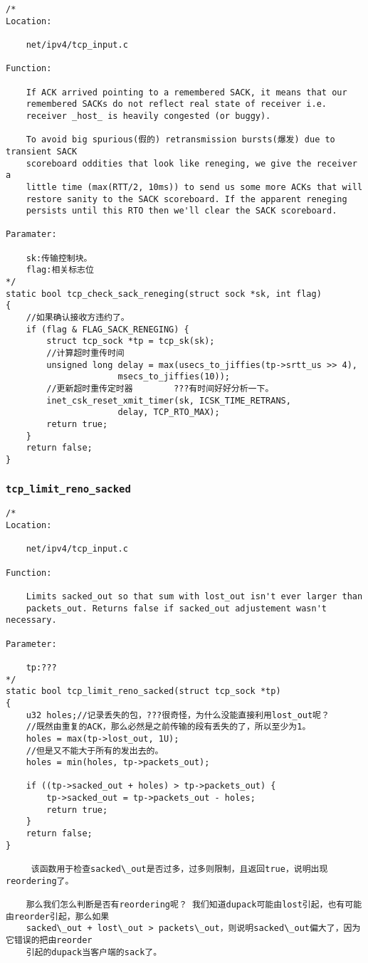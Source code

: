 \begin{verbatim}
/*
Location:

    net/ipv4/tcp_input.c

Function:

    If ACK arrived pointing to a remembered SACK, it means that our
    remembered SACKs do not reflect real state of receiver i.e.
    receiver _host_ is heavily congested (or buggy).

    To avoid big spurious(假的) retransmission bursts(爆发) due to transient SACK
    scoreboard oddities that look like reneging, we give the receiver a
    little time (max(RTT/2, 10ms)) to send us some more ACKs that will
    restore sanity to the SACK scoreboard. If the apparent reneging
    persists until this RTO then we'll clear the SACK scoreboard.

Paramater:

    sk:传输控制块。
    flag:相关标志位
*/
static bool tcp_check_sack_reneging(struct sock *sk, int flag)
{
    //如果确认接收方违约了。
    if (flag & FLAG_SACK_RENEGING) {
        struct tcp_sock *tp = tcp_sk(sk);
        //计算超时重传时间
        unsigned long delay = max(usecs_to_jiffies(tp->srtt_us >> 4),
                      msecs_to_jiffies(10));
        //更新超时重传定时器        ???有时间好好分析一下。
        inet_csk_reset_xmit_timer(sk, ICSK_TIME_RETRANS,
                      delay, TCP_RTO_MAX);
        return true;
    }
    return false;
}
\end{verbatim}
        \subsubsection{\texttt{tcp_limit_reno_sacked}}
\begin{verbatim}
/* 
Location:

    net/ipv4/tcp_input.c

Function:

    Limits sacked_out so that sum with lost_out isn't ever larger than
    packets_out. Returns false if sacked_out adjustement wasn't necessary.

Parameter:

    tp:???
*/
static bool tcp_limit_reno_sacked(struct tcp_sock *tp)
{
    u32 holes;//记录丢失的包，???很奇怪，为什么没能直接利用lost_out呢？
    //既然由重复的ACK，那么必然是之前传输的段有丢失的了，所以至少为1。
    holes = max(tp->lost_out, 1U);
    //但是又不能大于所有的发出去的。
    holes = min(holes, tp->packets_out);

    if ((tp->sacked_out + holes) > tp->packets_out) {
        tp->sacked_out = tp->packets_out - holes;
        return true;
    }
    return false;
}

     该函数用于检查sacked\_out是否过多，过多则限制，且返回true，说明出现reordering了。

    那么我们怎么判断是否有reordering呢？ 我们知道dupack可能由lost引起，也有可能由reorder引起，那么如果 
    sacked\_out + lost\_out > packets\_out，则说明sacked\_out偏大了，因为它错误的把由reorder 
    引起的dupack当客户端的sack了。
\end{verbatim}
